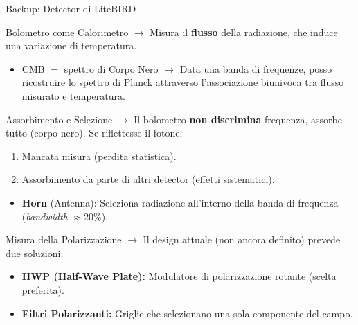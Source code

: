 \documentclass[10pt, aspectratio=169, handout]{beamer}
\begin{document}
\begin{frame}{Backup: Detector di LiteBIRD}
    \footnotesize %

    \begin{block}{Bolometro come Calorimetro}
        $\rightarrow$ Misura il \textbf{flusso} della radiazione, che induce una variazione di temperatura.
        \vspace{-0.2cm}
        \begin{itemize}
            \item CMB $=$ spettro di Corpo Nero $\rightarrow$ Data una banda di frequenze, posso ricostruire lo spettro di Planck attraverso l'associazione biunivoca tra flusso misurato e temperatura.
        \end{itemize}
    \end{block}

    \vspace{0.1cm}

    \begin{block}{Assorbimento e Selezione}
        $\rightarrow$ Il bolometro \textbf{non discrimina} frequenza, assorbe tutto (corpo nero). Se riflettesse il fotone:
        \vspace{-0.2cm}
        \begin{enumerate}
            \item Mancata misura (perdita statistica).
            \item Assorbimento da parte di altri detector (effetti sistematici).
        \end{enumerate}
        \vspace{-0.2cm}
        \begin{itemize}
            \item \textbf{Horn} (Antenna): Seleziona radiazione all'interno della banda di frequenza (\textit{bandwidth} $\approx 20\%$).
        \end{itemize}
    \end{block}

    \vspace{0.1cm}

    \begin{block}{Misura della Polarizzazione}
        $\rightarrow$ Il design attuale (non ancora definito) prevede due soluzioni:
        \vspace{-0.2cm}
        \begin{itemize}
            \item \textbf{HWP (Half-Wave Plate):} Modulatore di polarizzazione rotante (scelta preferita).
            \item \textbf{Filtri Polarizzanti:} Griglie che selezionano una sola componente del campo.
        \end{itemize}
    \end{block}

\end{frame}




 
\end{document}
